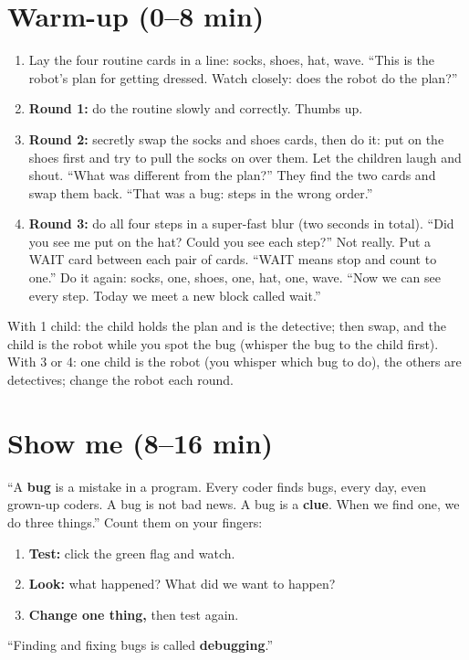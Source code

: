 \section{Warm-up (0--8 min)}
\begin{unplugged}
\begin{enumerate}[leftmargin=1.4em,itemsep=1pt]
  \item Lay the four routine cards in a line: socks, shoes, hat, wave. \enquote{This is the robot's plan for getting dressed. Watch closely: does the robot do the plan?}
  \item \textbf{Round 1:} do the routine slowly and correctly. Thumbs up.
  \item \textbf{Round 2:} secretly swap the socks and shoes cards, then do it: put on the shoes first and try to pull the socks on over them. Let the children laugh and shout. \enquote{What was different from the plan?} They find the two cards and swap them back. \enquote{That was a bug: steps in the wrong order.}
  \item \textbf{Round 3:} do all four steps in a super-fast blur (two seconds in total). \enquote{Did you see me put on the hat? Could you see each step?} Not really. Put a WAIT card between each pair of cards. \enquote{WAIT means stop and count to one.} Do it again: socks, one, shoes, one, hat, one, wave. \enquote{Now we can see every step. Today we meet a new block called wait.}
\end{enumerate}
With 1 child: the child holds the plan and is the detective; then swap, and the child is the robot while you spot the bug (whisper the bug to the child first). With 3 or 4: one child is the robot (you whisper which bug to do), the others are detectives; change the robot each round.
\end{unplugged}

\section{Show me (8--16 min)}
\begin{teacherscript}
\enquote{A \textbf{bug} is a mistake in a program. Every coder finds bugs, every day, even grown-up coders. A bug is not bad news. A bug is a \textbf{clue}. When we find one, we do three things.} Count them on your fingers:
\begin{enumerate}[leftmargin=1.4em,itemsep=1pt]
  \item \textbf{Test:} click the green flag and watch.
  \item \textbf{Look:} what happened? What did we want to happen?
  \item \textbf{Change one thing,} then test again.
\end{enumerate}
\enquote{Finding and fixing bugs is called \textbf{debugging}.}
\end{teacherscript}

